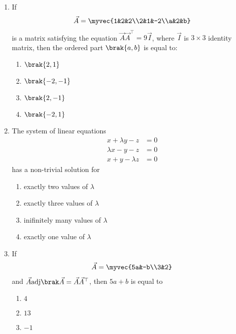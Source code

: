 \begin{enumerate}[label=\thesubsection.\arabic*.,ref=\thesubsection.\theenumi]
	\item If \begin{align*} \vec{A} = \myvec{1&2&2\\2&1&-2\\a&2&b} \end{align*} is a matrix satisfying the equation $\vec{A}\vec{A}^{\top} = 9\vec{I}$, where $\vec{I}$ is $3\times3$ identity matrix, then the ordered part $\brak{a,b}$ is equal to:
	\hfill {}{\par}
\begin{multicols}{4}
	\begin{enumerate}
	    	\item $\brak{2,1}$ 
	    	\item $\brak{-2,-1}$ 
	    	\item $\brak{2,-1}$ 
	   	\item $\brak{-2,1}$ 
	\end{enumerate}
\end{multicols}
	\item The system of linear equations 
	\begin{align*}
		x+\lambda y-z &= 0\\
		\lambda x-y-z &= 0\\
		x+y-\lambda z &= 0
	\end{align*}
	has a non-trivial solution for
	\hfill{}
\begin{multicols}{2}
	\begin{enumerate}
		\item exactly two values of $\lambda$ 
		\item exactly three values of $\lambda$ 
		\item inifinitely many values of $\lambda$
		\item exactly one value of $\lambda$ 
	\end{enumerate}
\end{multicols}
\item If \begin{align*} \vec{A} = \myvec{5a&-b\\3&2}\end{align*} and $\vec{A} \adj{\vec{A}} = \vec{A}\vec{A}^{\top}$, then $5a + b$ is equal to
	\hfill{}
\begin{multicols}{4}
	\begin{enumerate}
	    	\item $4$ 
	    	\item $13$
	    	\item $-1$

\end{enumerate}
\end{multicols}
\end{enumerate}
